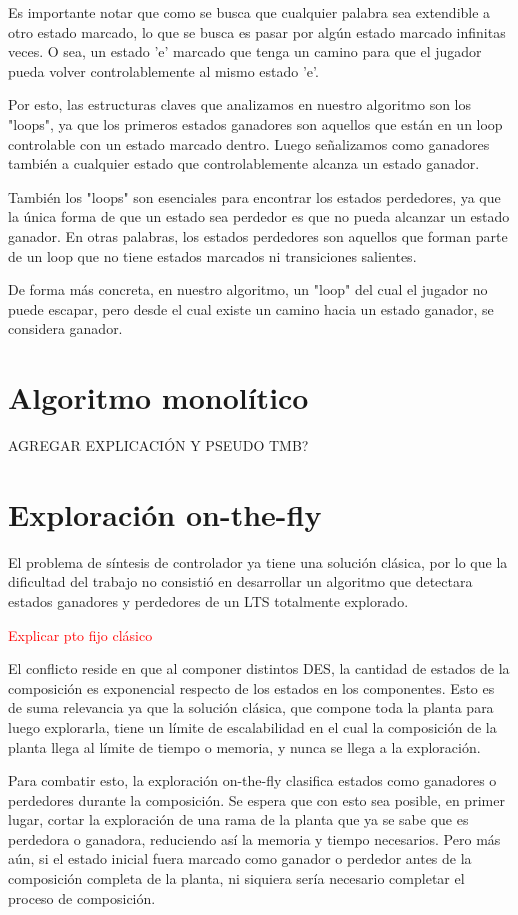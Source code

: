 Es importante notar que como se busca que cualquier palabra sea extendible a otro estado marcado, lo que se busca es pasar por algún estado marcado infinitas veces. O sea, un estado 'e' marcado que tenga un camino para que el jugador pueda volver controlablemente al mismo estado 'e'.

Por esto, las estructuras claves que analizamos en nuestro algoritmo son los "loops", ya que los primeros estados ganadores son aquellos que están en un loop controlable con un estado marcado dentro. Luego señalizamos como ganadores también a cualquier estado que controlablemente alcanza un estado ganador.

También los "loops" son esenciales para encontrar los estados perdedores, ya que la única forma de que un estado sea perdedor es que no pueda alcanzar un estado ganador. En otras palabras, los estados perdedores son aquellos que forman parte de un loop que no tiene estados marcados ni transiciones salientes.

De forma más concreta, en nuestro algoritmo, un "loop" del cual el jugador no puede escapar, pero desde el cual existe un camino hacia un estado ganador, se considera ganador.

\section{Algoritmo monolítico}
AGREGAR EXPLICACIÓN Y PSEUDO TMB?

\section{Exploración on-the-fly}

El problema de síntesis de controlador ya tiene una solución clásica, por lo que la dificultad del trabajo no consistió en desarrollar un algoritmo que detectara estados ganadores y perdedores de un LTS totalmente explorado. 

\textcolor{red}{Explicar pto fijo clásico}

El conflicto reside en que al componer distintos DES, la cantidad de estados de la composición es exponencial respecto de los estados en los componentes. Esto es de suma relevancia ya que la solución clásica, que compone toda la planta para luego explorarla, tiene un límite de escalabilidad en el cual la composición de la planta llega al límite de tiempo o memoria, y nunca se llega a la exploración.

Para combatir esto, la exploración on-the-fly clasifica estados como ganadores o perdedores durante la composición. Se espera que con esto sea posible, en primer lugar, cortar la exploración de una rama de la planta que ya se sabe que es perdedora o ganadora, reduciendo así la memoria y tiempo necesarios. Pero más aún, si el estado inicial fuera marcado como ganador o perdedor antes de la composición completa de la planta, ni siquiera sería necesario completar el proceso de composición.

